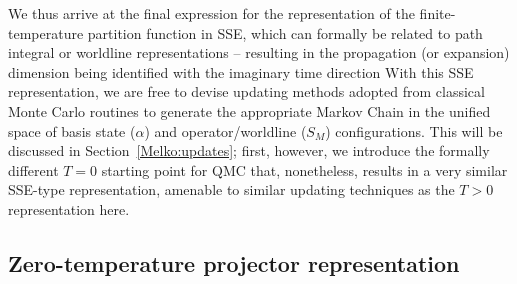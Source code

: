 \documentclass[vecphys]{svmult}
\begin{document}
We thus arrive at the final expression for the representation of the finite-temperature partition function in SSE, which 
can formally be related to path integral or worldline representations -- resulting in the propagation (or expansion) dimension being identified with the imaginary time direction \cite{Melko:HK,Melko:Assaad07}
With this SSE representation, we are free to devise updating methods adopted from classical Monte Carlo routines to generate the appropriate Markov Chain in the unified space of  basis state ($\alpha$) and operator/worldline ($S_M$) configurations.  This will be discussed in Section~\ref{Melko:updates}; first, however, we introduce the formally different $T=0$ starting point for QMC that, nonetheless, results in a very similar SSE-type representation, amenable to similar updating techniques as the $T > 0$ representation here.

\subsection{Zero-temperature projector representation} \label{Melko:secT0}
\end{document}
